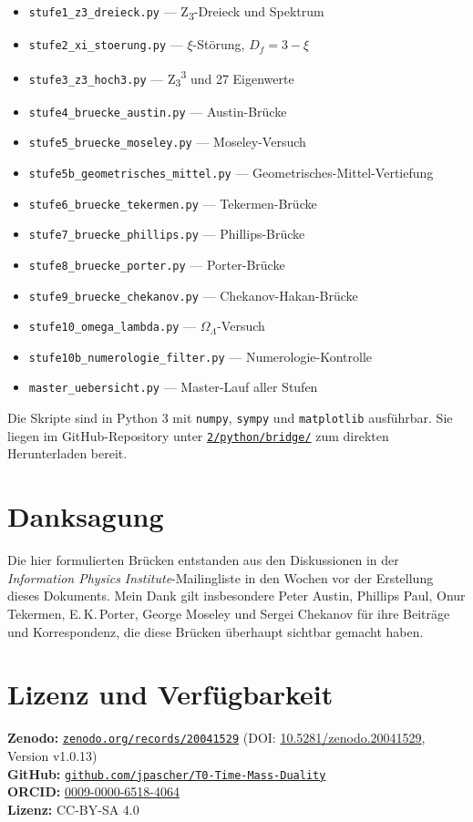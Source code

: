 \begin{itemize}
\item \texttt{stufe1\_z3\_dreieck.py} — Z\textsubscript{3}-Dreieck und Spektrum
\item \texttt{stufe2\_xi\_stoerung.py} — \(\xi\)-Störung, \(D_f = 3 - \xi\)
\item \texttt{stufe3\_z3\_hoch3.py} — Z\textsubscript{3}\textsuperscript{3} und 27 Eigenwerte
\item \texttt{stufe4\_bruecke\_austin.py} — Austin-Brücke
\item \texttt{stufe5\_bruecke\_moseley.py} — Moseley-Versuch
\item \texttt{stufe5b\_geometrisches\_mittel.py} — Geometrisches-Mittel-Vertiefung
\item \texttt{stufe6\_bruecke\_tekermen.py} — Tekermen-Brücke
\item \texttt{stufe7\_bruecke\_phillips.py} — Phillips-Brücke
\item \texttt{stufe8\_bruecke\_porter.py} — Porter-Brücke
\item \texttt{stufe9\_bruecke\_chekanov.py} — Chekanov-Hakan-Brücke
\item \texttt{stufe10\_omega\_lambda.py} — \(\Omega_\Lambda\)-Versuch
\item \texttt{stufe10b\_numerologie\_filter.py} — Numerologie-Kontrolle
\item \texttt{master\_uebersicht.py} — Master-Lauf aller Stufen
\end{itemize}

Die Skripte sind in Python 3 mit \texttt{numpy}, \texttt{sympy} und \texttt{matplotlib} ausführbar. Sie liegen im GitHub-Repository unter \href{https://github.com/jpascher/T0-Time-Mass-Duality/tree/main/2/python/bridge}{\texttt{2/python/bridge/}} zum direkten Herunterladen bereit.

\section*{Danksagung}

Die hier formulierten Brücken entstanden aus den Diskussionen in der \emph{Information Physics Institute}-Mailingliste in den Wochen vor der Erstellung dieses Dokuments. Mein Dank gilt insbesondere Peter Austin, Phillips Paul, Onur Tekermen, E.\,K.\,Porter, George Moseley und Sergei Chekanov für ihre Beiträge und Korrespondenz, die diese Brücken überhaupt sichtbar gemacht haben.

\section*{Lizenz und Verfügbarkeit}

\textbf{Zenodo:} \href{https://zenodo.org/records/20041529}{\texttt{zenodo.org/records/20041529}} (DOI: \href{https://doi.org/10.5281/zenodo.20041529}{10.5281/zenodo.20041529}, Version v1.0.13)\\
\textbf{GitHub:} \href{https://github.com/jpascher/T0-Time-Mass-Duality}{\texttt{github.com/jpascher/T0-Time-Mass-Duality}}\\
\textbf{ORCID:} \href{https://orcid.org/0009-0000-6518-4064}{0009-0000-6518-4064}\\
\textbf{Lizenz:} CC-BY-SA 4.0

